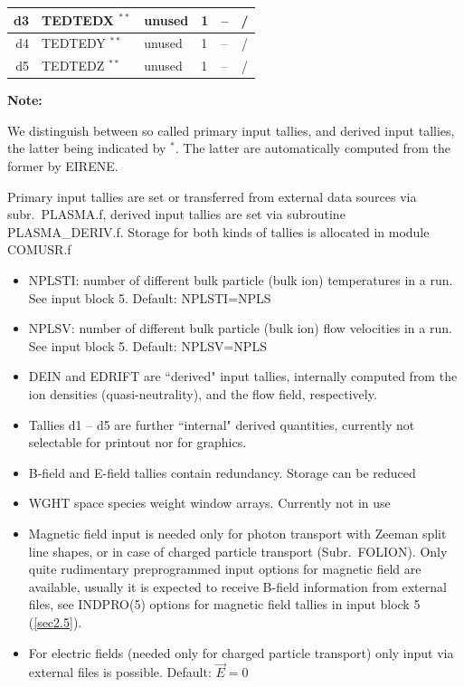 \begin{landscape}
\begin{longtable}{|r|l|l|l|l|c|}
    \\ \hline
    d3                     & TEDTEDX $^{**}
    $                      & unused                       & 1                                 & --
			   & /                                                                     \\
    \hline
    d4                     & TEDTEDY $^{**}
    $                      & unused                       & 1                                 & --
			   & /                                                                     \\
    \hline
    d5                     & TEDTEDZ $^{**}
    $                      & unused                       & 1                                 & --
			   & /                                                                     \\
    \hline
  \end{longtable}

  \textbf{Note:} 

  We distinguish between so called primary input tallies, and
  derived input tallies, the latter being  indicated by $^*$.
  The latter are automatically computed from the former by EIRENE.

  Primary input tallies are set or transferred from external data sources via
  subr.\ PLASMA.f, derived input tallies are set via subroutine PLASMA\_DERIV.f.
  Storage for both kinds of tallies is allocated in module COMUSR.f

  \begin{itemize}
    \item NPLSTI: number of different bulk particle (bulk ion) temperatures in a
	  run.
	  See input block 5.
	  Default: NPLSTI=NPLS 
    \item NPLSV: number of different bulk particle (bulk ion) flow velocities
	  in a run.
	  See input block 5.
	  Default: NPLSV=NPLS 
    \item DEIN and EDRIFT are ``derived" input tallies, internally computed from
	  the ion densities (quasi-neutrality), and the flow field, respectively.
    \item Tallies d1 -- d5 are further ``internal" derived quantities, currently
	  not selectable for printout nor for graphics.
    \item B-field and E-field tallies contain redundancy.
	  Storage can be reduced
    \item WGHT space species  weight window arrays.
	  Currently not in use 
    \item Magnetic field input is needed only for photon transport with Zeeman
	  split line shapes, or in case of charged particle transport (Subr.\ FOLION).
	  Only quite rudimentary preprogrammed input options for magnetic field are
	  available, usually it is expected to receive B-field information from external
	  files, see INDPRO(5) options for magnetic field tallies in input block 5
	  (\cref{sec2.5}).
    \item For electric fields (needed only for charged particle transport) only
	  input via external files is possible.
	  Default: $\vec{E} = 0$
  \end{itemize}


\end{landscape}
